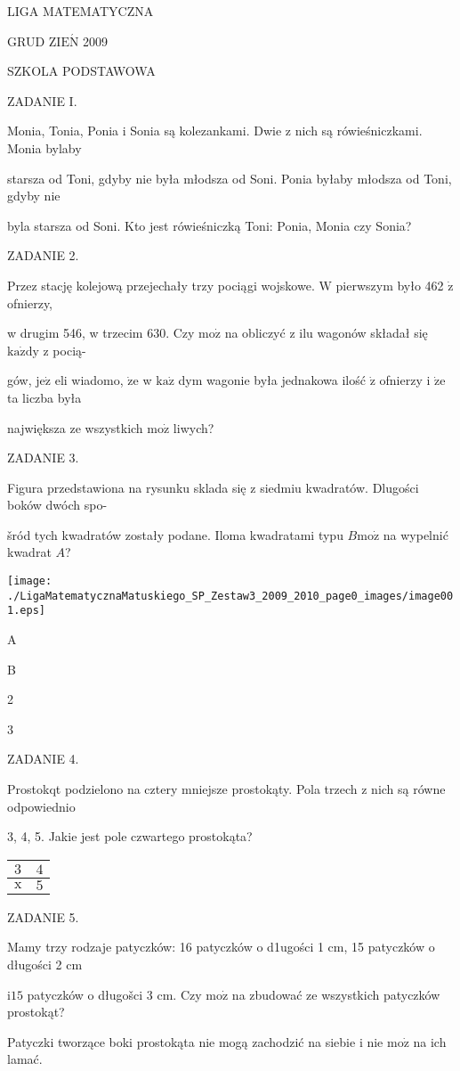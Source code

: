 \documentclass[a4paper,12pt]{article}
\begin{document}
LIGA MATEMATYCZNA

GRUD Z$\mathrm{I}\mathrm{E}\acute{\mathrm{N}}$ 2009

SZKOLA PODSTAWOWA

ZADANIE I.

Monia, Tonia, Ponia i Sonia są kolezankami. Dwie z nich są rówieśniczkami. Monia bylaby

starsza od Toni, gdyby nie była młodsza od Soni. Ponia byłaby młodsza od Toni, gdyby nie

byla starsza od Soni. Kto jest rówieśniczką Toni: Ponia, Monia czy Sonia?

ZADANIE 2.

Przez stację kolejową przejechały trzy pociągi wojskowe. $\mathrm{W}$ pierwszym było 462 $\dot{\mathrm{z}}$ ofnierzy,

w drugim 546, w trzecim 630. Czy $\mathrm{m}\mathrm{o}\dot{\mathrm{z}}$ na obliczyć z ilu wagonów składał się $\mathrm{k}\mathrm{a}\dot{\mathrm{z}}\mathrm{d}\mathrm{y}$ z pocią-

gów, $\mathrm{j}\mathrm{e}\dot{\mathrm{z}}$ eli wiadomo, $\dot{\mathrm{z}}\mathrm{e}$ w $\mathrm{k}\mathrm{a}\dot{\mathrm{z}}$ dym wagonie była jednakowa ilość $\dot{\mathrm{z}}$ ofnierzy i $\dot{\mathrm{z}}\mathrm{e}$ ta liczba była

największa ze wszystkich $\mathrm{m}\mathrm{o}\dot{\mathrm{z}}$ liwych?

ZADANIE 3.

Figura przedstawiona na rysunku sklada się z siedmiu kwadratów. Dlugości boków dwóch spo-

šród tych kwadratów zostały podane. Iloma kwadratami typu $B\mathrm{m}\mathrm{o}\dot{\mathrm{z}}$ na wypelnić kwadrat $A$?
\begin{center}
\texttt{[image: ./LigaMatematycznaMatuskiego\_SP\_Zestaw3\_2009\_2010\_page0\_images/image001.eps]}
\end{center}
A

B

2

3

ZADANIE 4.

Prostokqt podzielono na cztery mniejsze prostokąty. Pola trzech z nich są równe odpowiednio

3, 4, 5. Jakie jest pole czwartego prostokąta?
\begin{center}
\begin{tabular}{|l|l|}
\hline
\multicolumn{1}{|l|}{$3$}&	\multicolumn{1}{|l|}{ $4$}	\\
\hline
\multicolumn{1}{|l|}{ $\mathrm{x}$}&	\multicolumn{1}{|l|}{ $5$}	\\
\hline
\end{tabular}

\end{center}
ZADANIE 5.

Mamy trzy rodzaje patyczków: 16 patyczków o d1ugości 1 cm, 15 patyczków o długości 2 cm

$\mathrm{i} 15$ patyczków o długošci 3 cm. Czy $\mathrm{m}\mathrm{o}\dot{\mathrm{z}}$ na zbudować ze wszystkich patyczków prostokąt?

Patyczki tworzące boki prostokąta nie mogą zachodzić na siebie i nie $\mathrm{m}\mathrm{o}\dot{\mathrm{z}}$ na ich lamać.
\end{document}

